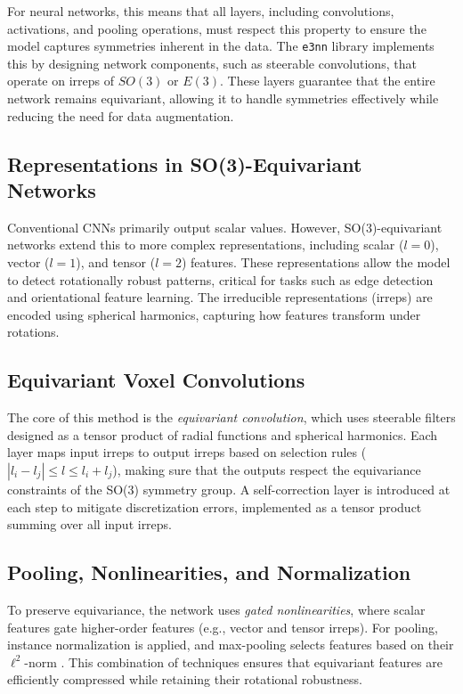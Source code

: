 \documentclass[letterpaper]{article}
\begin{document}
For neural networks, this means that all layers, including convolutions, activations, and pooling operations, must respect this property to ensure the model captures symmetries inherent in the data. The \texttt{e3nn} library \cite{geiger2022e3nn} implements this by designing network components, such as steerable convolutions, that operate on irreps of \(SO(3)\) or \(E(3)\). These layers guarantee that the entire network remains equivariant, allowing it to handle symmetries effectively while reducing the need for data augmentation.



\subsection{Representations in SO(3)-Equivariant Networks}
Conventional CNNs primarily output scalar values. However, SO(3)-equivariant networks extend this to more complex representations, including scalar ($l=0$), vector ($l=1$), and tensor ($l=2$) features. These representations allow the model to detect rotationally robust patterns, critical for tasks such as edge detection and orientational feature learning. The irreducible representations (irreps) are encoded using spherical harmonics, capturing how features transform under rotations.

\subsection{Equivariant Voxel Convolutions}
The core of this method is the \textit{equivariant convolution}, which uses steerable filters designed as a tensor product of radial functions and spherical harmonics. Each layer maps input irreps to output irreps based on selection rules ($|l_i - l_j| \leq l \leq l_i + l_j$), making sure that the outputs respect the equivariance constraints of the SO(3) symmetry group. A self-correction layer is introduced at each step to mitigate discretization errors, implemented as a tensor product summing over all input irreps.

\subsection{Pooling, Nonlinearities, and Normalization}
To preserve equivariance, the network uses \textit{gated nonlinearities}, where scalar features gate higher-order features (e.g., vector and tensor irreps). For pooling, instance normalization is applied, and max-pooling selects features based on their $\ell^2$-norm \cite{cesa2021en}. This combination of techniques ensures that equivariant features are efficiently compressed while retaining their rotational robustness.
\end{document}
